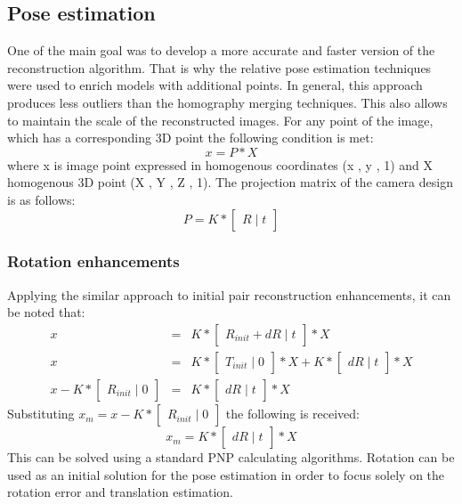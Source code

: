 \subsection{Pose estimation}
One of the main goal was to develop a more accurate and faster version of the reconstruction algorithm. That is why the relative pose estimation techniques were used to enrich models with additional points. In general, this approach produces less outliers than the homography merging techniques. This also allows to maintain the scale of the reconstructed images. For any point of the image, which has a corresponding 3D point the following condition is met:
\begin{equation} \label{eq:projectionEquation}
 x = P * X
\end{equation}
where x is image point expressed in homogenous coordinates (x , y , 1) and X homogenous 3D point (X , Y , Z , 1). 
The projection matrix of the camera design is as follows: 
\begin{equation} \label{eq:projectionEquation}
 P = K * \begin{bmatrix}R\mid t\end{bmatrix}
\end{equation}
\subsubsection{Rotation enhancements}
Applying the similar approach to initial pair reconstruction enhancements, it can be noted that:
\begin{equation} \label{eq:projectionRotError1}
\begin{array}{rcl}
 x & = & K * \begin{bmatrix}R_{init} + dR\mid t\end{bmatrix} * X \\
 x & = & K * \begin{bmatrix}T_{init}\mid 0\end{bmatrix} * X + K * \begin{bmatrix}dR\mid t\end{bmatrix} * X \\
 x - K * \begin{bmatrix}R_{init}\mid 0\end{bmatrix} & = & K * \begin{bmatrix}dR\mid t\end{bmatrix} * X
\end{array}
\end{equation}
Substituting $x_{m} = x - K * \begin{bmatrix}R_{init}\mid 0\end{bmatrix}$ the following is received: 
\begin{equation} \label{eq:projectionRotError2}
x_{m} = K * \begin{bmatrix}dR\mid t\end{bmatrix} * X
\end{equation}
This can be solved using a standard PNP calculating algorithms. Rotation can be used as an initial solution for the pose estimation in order to focus solely on the rotation error and translation estimation.
